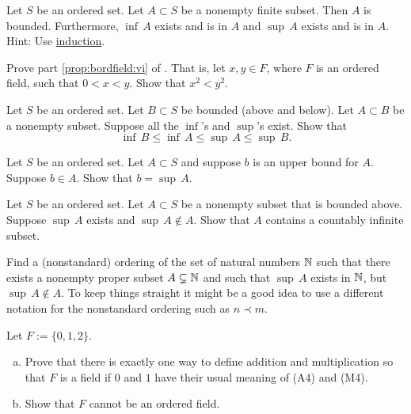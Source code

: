 \begin{exercise} \label{exercise:finitesethasminmax}
Let $S$ be an ordered set.  Let $A \subset S$ be a nonempty finite subset.
Then $A$ is bounded.  Furthermore,
$\inf\, A$ exists and is in $A$ and 
$\sup\, A$ exists and is in $A$.  Hint: Use
\hyperref[induction:thm]{induction}.
\end{exercise}

\begin{exercise} \label{exercise:squareineq}
Prove part \ref{prop:bordfield:vi} of .
That is, let $x, y \in F$, where $F$ is an ordered field, such that
$0 < x < y$.  Show that $x^2 < y^2$.
\end{exercise}

\begin{exercise}
Let $S$ be an ordered set.  Let $B \subset S$ be bounded (above and
below).  Let $A \subset B$ be a nonempty subset.
Suppose all the $\inf$'s and
$\sup$'s exist. Show that
\begin{equation*}
\inf\, B \leq \inf\, A \leq \sup\, A \leq \sup\, B .
\end{equation*}
\end{exercise}

\begin{exercise}
Let $S$ be an ordered set.  Let $A \subset S$ and suppose 
$b$ is an upper bound for $A$.  Suppose $b \in A$.  Show
that $b = \sup\, A$.
\end{exercise}

\begin{exercise}
Let $S$ be an ordered set.  Let $A \subset S$ be a nonempty subset
that is bounded above.
Suppose $\sup\, A$ exists and
$\sup\, A \notin A$.
Show that $A$ contains a countably infinite
subset.
\end{exercise}

\begin{exercise}
Find a (nonstandard) ordering of the set of natural numbers ${\mathbb{N}}$
such that there exists a nonempty proper subset $A \subsetneq {\mathbb{N}}$
and such that $\sup\, A$ exists in ${\mathbb{N}}$, but $\sup\, A \notin A$.
To keep things straight it might be a good idea to use a different
notation for the nonstandard ordering such as $n \prec m$.
\end{exercise}

\begin{exercise}
Let $F := \{ 0, 1, 2 \}$.
\begin{enumerate}[a)]
\item
Prove that there is
exactly one way to define addition and multiplication so that $F$ is
a field if $0$ and $1$ have their usual meaning of (A4) and (M4).
\item
Show that $F$ cannot be an ordered field.
\end{enumerate}
\end{exercise}

